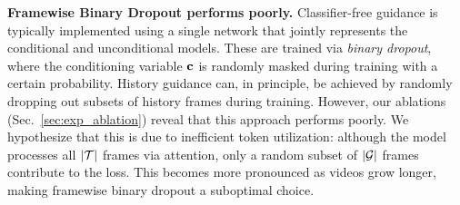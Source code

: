\textbf{Framewise Binary Dropout performs poorly.} 
Classifier-free guidance is typically implemented using a single network that jointly represents the conditional and unconditional models. These are trained via \emph{binary dropout}, where the conditioning variable ${\mathbf{c}}$ is randomly masked during training  with a certain probability. 
History guidance can, in principle, be achieved by randomly dropping out subsets of history frames during training.
However, our ablations (Sec.~\ref{sec:exp_ablation}) reveal that this approach performs poorly. We hypothesize that this is due to inefficient token utilization: although the model processes all $|{\mathcal{T}}|$ frames via attention, only a random subset of $|{\mathcal{G}}|$ frames contribute to the loss. This becomes more pronounced as videos grow longer, making framewise binary dropout a suboptimal choice.




